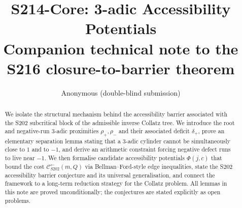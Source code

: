 \documentclass[11pt,a4paper]{article}
\title{S214-Core: 3-adic Accessibility Potentials\\
\large Companion technical note to the S216 closure-to-barrier theorem}
\author{Anonymous (double-blind submission)}
\date{}
\theoremstyle{plain}
\theoremstyle{definition}
\theoremstyle{remark}
\begin{document}
\maketitle

\begin{abstract}
We isolate the structural mechanism behind the accessibility barrier
associated with the S202 subcritical block of the admissible inverse
Collatz tree. We introduce the root and negative-run \(3\)-adic
proximities \(\rho_+,\rho_-\) and their associated deficit
\(\delta_+\), prove an elementary separation lemma stating that a
\(3\)-adic cylinder cannot be simultaneously close to \(1\) and to
\(-1\), and derive an arithmetic constraint forcing negative defect
runs to live near \(-1\). We then formalise candidate accessibility
potentials \(\Phi(j,c)\) that bound the cost
\(\mathcal C^{\leftarrow}_{S202}(m,Q)\) via Bellman--Ford-style edge
inequalities, state the S202 accessibility barrier conjecture and its
universal generalisation, and connect the framework to a long-term
reduction strategy for the Collatz problem. All lemmas in this note are
proved unconditionally; the conjectures are stated explicitly as open
problems.
\end{abstract}

\tableofcontents


\end{document}
